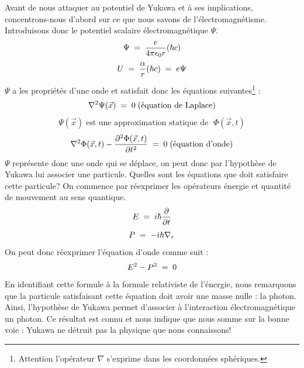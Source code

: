 Avant de nous attaquer au potentiel de Yukawa et à ses implications, concentrons-nous d'abord sur ce que nous savons de l'électromagnétisme. Introduisons donc le potentiel scalaire électromagnétique $\Psi$.
\begin{equation*}
    \Psi \; = \; \dfrac{e}{4\pi \epsilon_0 r}(\hbar c)
\end{equation*}
\begin{equation*}
    U \; = \;  \dfrac{\alpha}{r}(\hbar c)\; = \; e\Psi 
\end{equation*}
$\Psi$ a les propriétés d'une onde et satisfait donc les équations suivantes\footnote{Attention l'opérateur $\nabla$ s'exprime dans les coordonnées sphériques.} :
\begin{equation*}
    \nabla^2 \Psi(\Vec{x}) \; = \; 0 \; \text{(équation de Laplace)}
\end{equation*}
\begin{equation*}
    \Psi(\Vec{x}) \; \text{est une approximation statique de }\; \Phi(\Vec{x},t)
\end{equation*}
\begin{equation*}
    \nabla^2 \Phi(\Vec{x},t) - \dfrac{\partial^2\Phi(\Vec{x},t)}{ \partial t^2} \; = \; 0 \; \text{(équation d'onde)}
\end{equation*}
$\Psi$ représente donc une onde qui se déplace, on peut donc par l'hypothèse de Yukawa lui associer une particule. Quelles sont les équations que doit satisfaire cette particule? On commence par réexprimer les opérateurs énergie et quantité de mouvement au sens quantique.
\begin{equation*}
    E \; = \; i\hbar \dfrac{\partial}{\partial t}
\end{equation*}
\begin{equation*}
    P\; = \; -i\hbar \nabla_r
\end{equation*}
On peut donc réexprimer l'équation d'onde comme suit :
\begin{equation*}
    E^2 - P^2 \; = \; 0
\end{equation*}
En identifiant cette formule à la formule relativiste de l'énergie, nous remarquons que la particule satisfaisant cette équation doit avoir une masse nulle : la photon. Ainsi, l'hypothèse de Yukawa permet d'associer à l'interaction électromagnétique un photon. Ce résultat est connu et nous indique que nous somme sur la bonne voie : Yukawa ne détruit pas la physique que nous connaissons!\\

